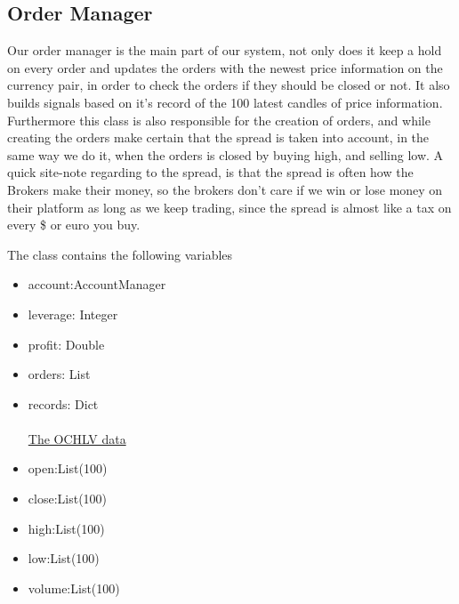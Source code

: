 \subsection{Order Manager}
Our order manager is the main part of our system, not only does it keep a hold on every order and updates the orders with the newest price information on the currency pair, in order to check the orders if they should be closed or not. It also builds signals based on it's record of the 100 latest candles of price information. Furthermore this class is also responsible for the creation of orders, and while creating the orders make certain that the spread is taken into account, in the same way we do it, when the orders is closed by buying high, and selling low. A quick site-note regarding to the spread, is that the spread is often how the Brokers make their money, so the brokers don't care if we win or lose money on their platform as long as we keep trading, since the spread is almost like a tax on every \$ or euro you buy.

The class contains the following variables
\begin{itemize}
\item{account:AccountManager}
\item{leverage: Integer}
\item{profit: Double}
\item{orders: List}
\item{records: Dict}
\\
\\
\underline{The OCHLV data}
\item{open:List(100)}
\item{close:List(100)}
\item{high:List(100)}
\item{low:List(100)}
\item{volume:List(100)}
\end{itemize}

